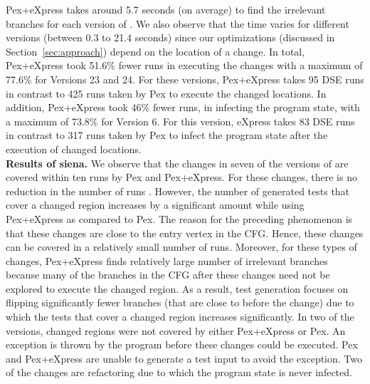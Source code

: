 Pex+eXpress takes around 5.7 seconds (on average) to find the irrelevant branches for each version of . We also observe that the time varies for different versions (between 0.3 to 21.4 seconds) since our optimizations (discussed in Section~\ref{sec:approach}) depend on the location of a change. In total, Pex+eXpress took 51.6\% fewer runs in executing the changes with a maximum of 77.6\% for Versions 23 and 24. For these versions, Pex+eXpress takes 95 DSE runs in contrast to 425 runs taken by Pex to execute the changed locations.  In addition, Pex+eXpress took 46\% fewer runs, in infecting the program state, with a maximum of 73.8\% for Version 6. For this version, eXpress takes 83 DSE runs in contrast to 317 runs taken by Pex to infect the program state after the execution of changed locations.  
\\ \textbf{Results of siena. }We observe that the changes in seven of the versions of  are covered within ten runs by Pex and Pex+eXpress. For these changes, there is no reduction in the number of runs . However, the number of generated tests that cover a changed region increases by a significant amount while using Pex+eXpress as compared to Pex. The reason for the preceding phenomenon is that these changes are close to the entry vertex in the CFG. Hence, these changes can be covered in a relatively small number of runs. Moreover, for these types of changes, Pex+eXpress finds relatively large number of irrelevant branches because many of the branches in the CFG after these changes need not be explored to execute the changed region. As a result, test generation focuses on flipping significantly fewer branches (that are close to before the change) due to which the tests that cover a changed region increases significantly. In two of the versions, changed regions were not covered by either Pex+eXpress or Pex. An exception is thrown by the program before these changes could be executed. Pex and  Pex+eXpress are unable to generate a test input to avoid the exception. Two of the changes are refactoring due to which the program state is never infected.
